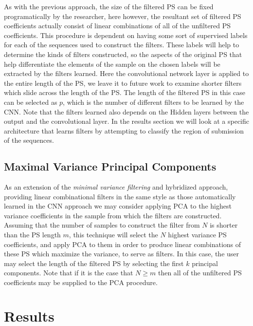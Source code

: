 \documentclass[12pt,conference]{IEEEtran}
\begin{document}
As with the previous approach, the size of the filtered PS can be fixed programatically by the researcher,
here however, the resultant set of filtered PS coefficients actually consist of linear combinations of 
all of the unfiltered PS coefficients.  This procedure is dependent on having some sort of supervised 
labels for each of the sequences used to construct the filters.  These labels will help to determine the 
kinds of filters constructed, so the aspects of the original PS that help differentiate the elements of the 
sample on the chosen labels will be extracted by the filters learned.  Here the convolutional network 
layer is applied to the entire length of the PS, we leave it to future work to examine shorter filters which
slide across the length of the PS.  The length of the filtered PS in this case can be selected as $p$, which
is the number of different filters to be learned by the CNN.  Note that the filters learned also depends 
on the Hidden layers between the output and the convolutional layer.  In the results section we will 
look at a specific architecture that learns filters by attempting to classify the region of submission of 
the sequences. 

\subsection{Maximal Variance Principal Components}

As an extension of the \textit{minimal variance filtering} and hybridized approach, providing linear combinational filters 
in the same style as those automatically learned in the CNN approach we may consider applying PCA 
to the highest variance coefficients in the sample from which the filters are constructed. 
Assuming that the number of samples to construct the filter from $N$ is shorter than the PS 
length $m$, this technique will select the $N$ highest variance PS coefficients, and apply PCA to them
in order to produce linear combinations of these PS which maximize the variance, to serve as filters. 
In this case, the user may select the length of the filtered PS by selecting the first $k$ principal 
components. 
Note that if it is the case that $N \geq m$ then all of the unfiltered PS coefficients may be supplied to 
the PCA procedure. 

\section{Results} 
\label{sec:res}
\end{document}
